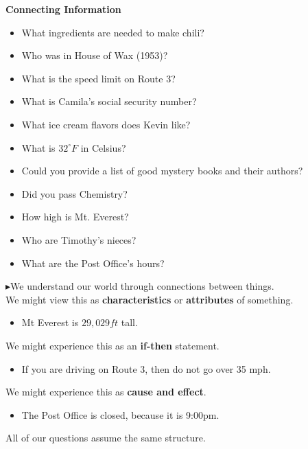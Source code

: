 \documentclass{ximera}
\begin{document}
\begin{observation} \textbf{\textcolor{blue!75!black}{Connecting Information}}  

\begin{itemize} 
\item What ingredients are needed to make chili?
\item Who was in House of Wax (1953)?
\item What is the speed limit on Route 3?
\item What is Camila's social security number?
\item What ice cream flavors does Kevin like?
\item What is $32^\circ F$ in Celsius?
\item Could you provide a list of good mystery books and their authors?
\item Did you pass Chemistry?
\item How high is Mt. Everest?
\item Who are Timothy's nieces?
\item What are the Post Office's hours?
\end{itemize}

$\blacktriangleright$We understand our world through connections between things. \\


We might view this as \textbf{\textcolor{purple!85!blue}{characteristics}} or \textbf{\textcolor{purple!85!blue}{attributes}} of something. 
\begin{itemize}
\item Mt Everest is $29,029 ft$ tall.
\end{itemize}


We might experience this as an \textbf{\textcolor{purple!85!blue}{if-then}} statement.
\begin{itemize}
\item If you are driving on Route 3, then do not go over 35 mph.
\end{itemize}



We might experience this as \textbf{\textcolor{purple!85!blue}{cause and effect}}.
\begin{itemize}
\item The Post Office is closed, because it is 9:00pm.
\end{itemize}

\end{observation}


All of our questions assume the same structure.  \\
\end{document}
